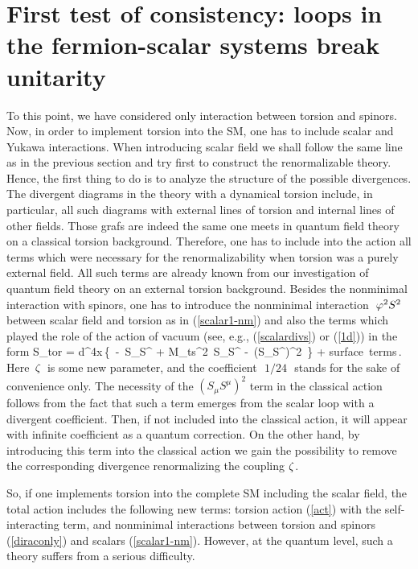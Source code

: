 \section{First test of consistency: loops in the fermion-scalar 
systems break unitarity}

To this point, we have considered only interaction between torsion
and spinors. Now, in order to implement torsion into the SM, one
has to include scalar and Yukawa interactions. 
When introducing scalar field we shall follow the
same line as in the previous section and try first to construct the
renormalizable theory. Hence, the first thing to do is to analyze
the structure of the possible divergences. The divergent diagrams
in the theory with a dynamical torsion include, in particular, all
such diagrams with external lines of torsion and internal lines
of other fields. Those grafs are indeed the same one meets in 
quantum field theory on a classical torsion background. Therefore,
one has to include into the action all terms which were necessary
for the renormalizability when torsion was a purely external field.
All such terms are already known from our investigation of quantum
field theory on an external torsion background. Besides the
nonminimal interaction with spinors, one has to introduce the 
nonminimal interaction $\,\,\varphi^2 S^2\,\,$ between scalar field
and torsion as in (\ref{scalar1-nm}) 
and also the terms which played the
role of the action of vacuum (see, e.g., (\ref{scalardivs})
or (\ref{1d})) in the form
\beq
S_{tor} = \int d^4x\,\left\{\, - \,S_{\mu\nu}S^{\mu\nu}
+ M_{ts}^2\, S_\mu S^\mu 
- \,\ze \left(S_\mu S^\mu\right)^2
\,\right\} + {\rm surface\, terms}\,.
\label{act}
\eeq
Here $\,\zeta\,$ is some new parameter, and the coefficient
$\,\,{1}/{24}\,\,$ stands for the sake of convenience only. The 
necessity of the $\left(S_\mu S^\mu\right)^2$
term in the classical action follows from the fact that such a
term emerges from the scalar loop with a divergent coefficient. 
Then, if not included into the classical action, it will
appear with 
infinite coefficient as a quantum correction. On the other hand, 
by introducing this term 
into the classical action we gain the possibility to remove 
the corresponding divergence renormalizing the coupling $\zeta$. 

So, if one implements torsion into the complete SM including the 
scalar field, the total action includes the following new terms: 
torsion action  (\ref{act}) with the self-interacting term, and 
nonminimal interactions between torsion and spinors (\ref{diraconly}) 
and scalars (\ref{scalar1-nm}). However, at the quantum level, such 
a theory suffers from a serious difficulty.

